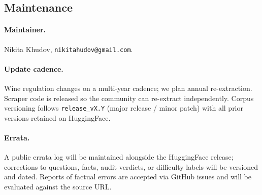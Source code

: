 \subsection{Maintenance}
\paragraph{Maintainer.}
Nikita Khudov, \texttt{nikitahudov@gmail.com}.

\paragraph{Update cadence.}
Wine regulation changes on a multi-year cadence; we plan annual
re-extraction. Scraper code is released so the community can
re-extract independently. Corpus versioning follows
\texttt{release\_vX.Y} (major release / minor patch) with all prior
versions retained on HuggingFace.

\paragraph{Errata.}
A public errata log will be maintained alongside the HuggingFace
release; corrections to questions, facts, audit verdicts, or
difficulty labels will be versioned and dated. Reports of factual
errors are accepted via GitHub issues and will be evaluated against
the source URL.
